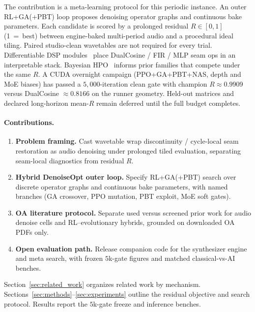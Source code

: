 The contribution is a meta-learning protocol for this periodic instance.
An outer RL+GA(+PBT) loop proposes denoising operator graphs and continuous bake parameters.
Each candidate is scored by a prolonged residual $R\in[0,1]$ (1~=~best) between engine-baked multi-period audio and a procedural ideal tiling.
Paired studio-clean wavetables are not required for every trial.
Differentiable DSP modules~\cite{engel2020} place DualCosine / FIR / MLP seam ops in an interpretable stack.
Bayesian HPO~\cite{snoek2012} informs prior families that compete under the same $R$.
A CUDA overnight campaign (PPO+GA+PBT+NAS, depth and MoE biases) has passed a $5{,}000$-iteration clean gate with champion $R\approx 0.9909$ versus DualCosine $\approx 0.8166$ on the runner geometry.
Held-out matrices and declared long-horizon mean-$R$ remain deferred until the full budget completes.

\paragraph{Contributions.}
\begin{enumerate}
  \item \textbf{Problem framing.} Cast wavetable wrap discontinuity / cycle-local seam restoration as audio denoising under prolonged tiled evaluation, separating seam-local diagnostics from residual $R$.
  \item \textbf{Hybrid DenoiseOpt outer loop.} Specify RL+GA(+PBT) search over discrete operator graphs and continuous bake parameters, with named branches (GA crossover, PPO mutation, PBT exploit, MoE soft gates).
  \item \textbf{OA literature protocol.} Separate used versus screened prior work for audio denoise cells and RL--evolutionary hybrids, grounded on downloaded OA PDFs only.
  \item \textbf{Open evaluation path.} Release companion code for the synthesizer engine and meta search, with frozen $5$k-gate figures and matched classical-vs-AI benches.
\end{enumerate}

Section~\ref{sec:related_work} organizes related work by mechanism.
Sections~\ref{sec:methods}--\ref{sec:experiments} outline the residual objective and search protocol.
Results report the $5$k-gate freeze and inference benches.

